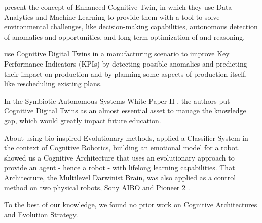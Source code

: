 \cite{eirinakis2020enhancing} present the concept of Enhanced Cognitive Twin, in which they use Data Analytics and Machine Learning to provide them with a tool to solve environmental challenges, like decision-making capabilities, autonomous detection of anomalies and opportunities, and long-term optimization of and reasoning.

\cite{rozanec2020towards} use Cognitive Digital Twins in a manufacturing scenario to improve Key Performance Indicators (KPIs) by detecting possible anomalies and predicting their impact on production and by planning some aspects of production itself, like rescheduling existing plans.

In the Symbiotic Autonomous Systems White Paper II \citep{initiative2018symbiotic}, the authors put Cognitive Digital Twins as an almost essential asset to manage the knowledge gap, which would greatly impact future education.


 About using bio-inspired Evolutionary methods, \cite{zhang2020affective} applied a Classifier System in the context of Cognitive Robotics, building an emotional model for a robot. \cite{bellas2010multilevel} showed us a Cognitive Architecture that uses an evolutionary approach to provide an agent - hence a robot - with lifelong learning capabilities. That Architecture, the Multilevel Darwinist Brain, was also applied as a control method on two physical robots, Sony AIBO and Pioneer 2 \citep{bellas2006adaptive}.

To the best of our knowledge, we found no prior work on Cognitive Architectures and Evolution Strategy.






